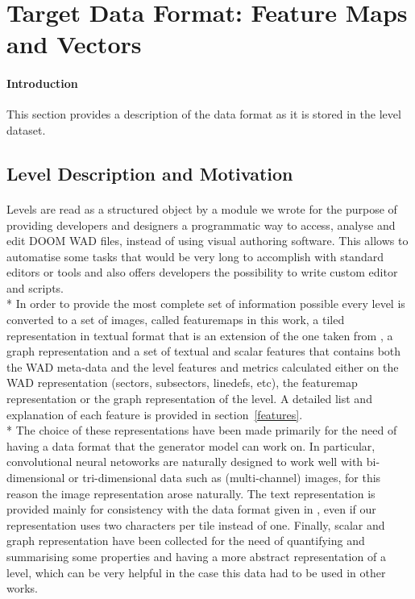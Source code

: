 \section{Target Data Format: Feature Maps and Vectors}
\label{sec:TargetFormat}
\paragraph{Introduction} This section provides a description of the data format as it is stored in the level dataset.
\subsection{Level Description and Motivation}
\paragraph{}Levels are read as a structured object by a module we wrote for the purpose of providing developers and designers a programmatic way to access, analyse and edit DOOM WAD files, instead of using visual authoring software. This allows to automatise some tasks that would be very long to accomplish with standard editors or tools and also offers developers the possibility to write custom editor and scripts. \\*
In order to provide the most complete set of information possible every level is converted to a set of images, called \glspl{featuremap} in this work, a tiled representation in textual format that is an extension of the one taken from \cite{VGLC}, a graph representation and a set of textual and scalar features that contains both the \gls{WAD} meta-data and the level features and metrics calculated either on the WAD representation (sectors, subsectors, linedefs, etc), the \gls{featuremap} representation or the graph representation of the level. A detailed list and explanation of each feature is provided in section~\ref{features}. \\*
The choice of these representations have been made primarily for the need of having a data format that the generator model can work  on. In particular, convolutional neural netoworks are naturally designed to work well with bi-dimensional or tri-dimensional data such as (multi-channel) images, for this reason the image representation arose naturally. The text representation is provided mainly for consistency with the data format given in \cite{VGLC}, even if our representation uses two characters per tile instead of one. Finally, scalar and graph representation have been collected for the need of quantifying and summarising some properties and having a more abstract representation of a level, which can be very helpful in the case this data had to be used in other works.

